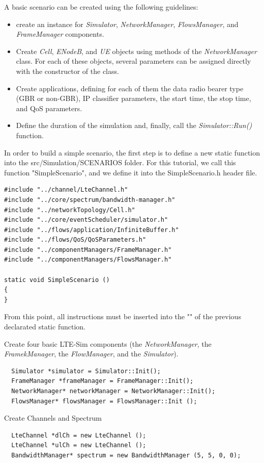 \documentclass[11pt]{article}
\begin{document}
A basic scenario can be created using the following guidelines:
\begin{itemize}
	\item create an instance for \emph{Simulator}, \emph{NetworkManager}, \emph{FlowsManager}, and \emph{FrameManager} components.
	\item Create \emph{Cell}, \emph{ENodeB}, and \emph{UE} objects using methods of the \emph{NetworkManager} class. For each of these objects, several parameters can be assigned directly with the constructor of the class. 
	\item Create applications, defining for each of them the data radio bearer type (GBR or non-GBR), IP classifier parameters, the start time, the stop time, and QoS parameters.
	\item Define the duration of the simulation and, finally, call the \emph{Simulator::Run()} function.  
\end{itemize}

In order to build a simple scenario, the first step is to define a new static function into the src/Simulation/SCENARIOS folder. For this tutorial, we call this function "SimpleScenario", and we define it into the SimpleScenario.h header file. 

\color{blue}
\begin{lstlisting}
#include "../channel/LteChannel.h"
#include "../core/spectrum/bandwidth-manager.h"
#include "../networkTopology/Cell.h"
#include "../core/eventScheduler/simulator.h"
#include "../flows/application/InfiniteBuffer.h"
#include "../flows/QoS/QoSParameters.h"
#include "../componentManagers/FrameManager.h"
#include "../componentManagers/FlowsManager.h"

static void SimpleScenario ()
{
}
\end{lstlisting}
\color{black}

From this point, all instructions must be inserted into the "{}" of the previous declarated static function.

Create four basic LTE-Sim components (the \emph{NetworkManager}, the \emph{FramekManager}, the \emph{FlowManager}, and the \emph{Simulator}).
\color{blue}
\begin{lstlisting}
  Simulator *simulator = Simulator::Init();
  FrameManager *frameManager = FrameManager::Init();
  NetworkManager* networkManager = NetworkManager::Init();
  FlowsManager* flowsManager = FlowsManager::Init ();
\end{lstlisting}
\color{black}
 
Create Channels and Spectrum
\color{blue}
\begin{lstlisting}
  LteChannel *dlCh = new LteChannel ();
  LteChannel *ulCh = new LteChannel ();
  BandwidthManager* spectrum = new BandwidthManager (5, 5, 0, 0);
\end{lstlisting}
\color{black}
\end{document}
